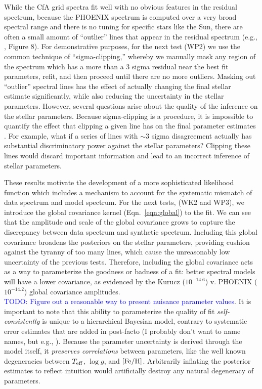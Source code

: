 \documentclass[iop,floatfix]{emulateapj}
\newcommand{\Z}{[{\rm Fe}/{\rm H}]}
\newcommand{\todo}[1]{ \textcolor{blue}{\\TODO: #1}}
\begin{document}
While the CfA grid spectra fit well with no obvious features in the residual spectrum, because the PHOENIX spectrum is computed over a very broad spectral range and there is no tuning for specific stars like the Sun, there are often a small amount of  ``outlier'' lines that appear in the residual spectrum (e.g., \citealt{husser13}, Figure 8). For demonstrative purposes, for the next test (WP2) we use the common technique of ``sigma-clipping,'' whereby we manually mask any region of the spectrum which has a more than a 3 sigma residual near the best fit parameters, refit, and then proceed until there are no more outliers. Masking out ``outlier'' spectral lines has the effect of actually changing the final stellar estimate significantly, while also reducing the uncertainty in the stellar parameters. However, several questions arise about the quality of the inference on the stellar parameters. Because sigma-clipping is a procedure, it is impossible to quantify the effect that clipping a given line has on the final parameter estimates \citep{hogg10}. For example, what if a series of lines with $\sim$3 sigma disagreement actually has substantial discriminatory power against the stellar parameters? Clipping these lines would discard important information and lead to an incorrect inference of stellar parameters.

These results motivate the development of a more sophisticated likelihood function which includes a mechanism to account for the systematic mismatch of data spectrum and model spectrum. For the next tests, (WK2 and WP3), we introduce the global covariance kernel (Eqn.~\ref{eqn:global}) to the fit. We can see that the amplitude and scale of the global covariance grows to capture the discrepancy between data spectrum and synthetic spectrum. Including this global covariance broadens the posteriors on the stellar parameters, providing cushion against the tyranny of too many lines, which cause the unreasonably low uncertainty of the previous tests. Therefore, including the global covariance acts as a way to parameterize the goodness or badness of a fit: better spectral models will have a lower covariance, as evidenced by the Kurucz ($10^{-14.6}$) v. PHOENIX ($10^{-14.2}$) global covariance amplitudes. \todo{Figure out a reasonable way to present nuisance parameter values}. It is important to note that this ability to parameterize the quality of fit \emph{self-consistently} is unique to a hierarchical Bayesian model, contrary to systematic error estimates that are added in post-facto (I probably don't want to name names, but e.g., \citealt{torres12, buchhave12}). Because the parameter uncertainty is derived through the model itself, it \emph{preserves correlations} between parameters, like the well known degeneracies between $T_{\rm eff}$, $\log g$, and $\Z$. Arbitrarily inflating the posterior estimates to reflect intuition would artificially destroy any natural degeneracy of parameters.  
\end{document}
